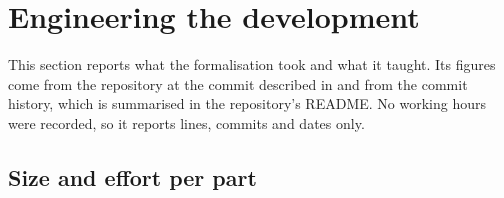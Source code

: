 \documentclass[pdflatex,sn-mathphys-num]{sn-jnl}
\theoremstyle{thmstyleone}
\theoremstyle{thmstylethree}
\begin{document}
\section{Engineering the development}
\label{sec:engineering}

This section reports what the formalisation took and what it taught. Its figures come from the
repository at the commit described in  and from the commit history, which is
summarised in the repository's README. No working hours were recorded, so it reports lines,
commits and dates only.

\subsection{Size and effort per part}
\label{sec:effort}
\end{document}
